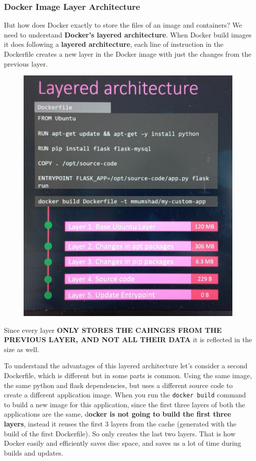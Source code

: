 \documentclass{article}
\begin{document}
\subsubsection{Docker Image Layer Architecture}

But how does Docker exactly to store the files of an image and containers? We need to understand \textbf{Docker's layered architecture}. When Docker build images it does following a \textbf{layered architecture}, each line of instruction in the Dockerfile creates a new layer in the Docker image with just the changes from the previous layer.

\begin{figure}[H]
    \centering
    \includegraphics[scale=0.15]{pictures/st1.png}
\end{figure}

Since every layer \textbf{ONLY STORES THE CAHNGES FROM THE PREVIOUS LAYER, AND NOT ALL THEIR DATA} it is reflected in the size as well.

To understand the advantages of this layered architecture let's consider a second Dockerfile, which is different but in some parts is common. Using the same image, the same python and flask dependencies, but uses a different source code to create a different application image. When you run the \verb|docker build| command to build a new image for this application, since the first three layers of both the applications are the same, d\textbf{ocker is not going to build the first three layers}, instead it reuses the first 3 layers from the cache (generated with the build of the first Dockerfile). So only creates the last two layers. That is how Docker easily and efficiently saves disc space, and saves us a lot of time during builds and updates.
\end{document}

